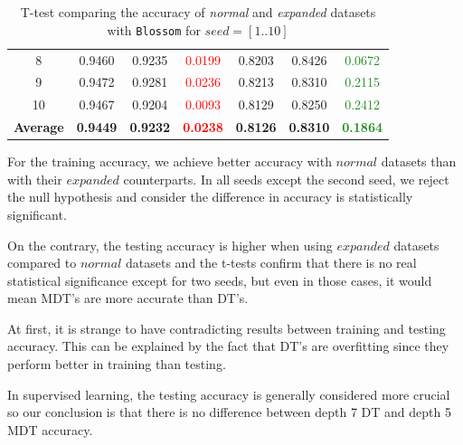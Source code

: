 \documentclass[12pt]{report}
\theoremstyle{definition}
\theoremstyle{definition}
\theoremstyle{definition}
\begin{document}
\begin{table}[ht]
{\begin{tabular}{ccccccc}
    \multicolumn{1}{c}{8}  & \multicolumn{1}{c}{0.9460} & \multicolumn{1}{c}{0.9235} & \multicolumn{1}{c}{\textcolor{        red}{0.0199}} & \multicolumn{1}{c}{0.8203} & \multicolumn{1}{c}{0.8426} & \multicolumn{1}{c}{\textcolor{ForestGreen}{0.0672}} \\
    \multicolumn{1}{c}{9}  & \multicolumn{1}{c}{0.9472} & \multicolumn{1}{c}{0.9281} & \multicolumn{1}{c}{\textcolor{        red}{0.0236}} & \multicolumn{1}{c}{0.8213} & \multicolumn{1}{c}{0.8310} & \multicolumn{1}{c}{\textcolor{ForestGreen}{0.2115}} \\
    \multicolumn{1}{c}{10} & \multicolumn{1}{c}{0.9467} & \multicolumn{1}{c}{0.9204} & \multicolumn{1}{c}{\textcolor{        red}{0.0093}} & \multicolumn{1}{c}{0.8129} & \multicolumn{1}{c}{0.8250} & \multicolumn{1}{c}{\textcolor{ForestGreen}{0.2412}} \\
    \hline
    \multicolumn{1}{c}{\bf Average} & \multicolumn{1}{c}{\bf 0.9449} & \multicolumn{1}{c}{\bf 0.9232} & \multicolumn{1}{c}{\textcolor{red}{\bf 0.0238}} & \multicolumn{1}{c}{\bf 0.8126} & \multicolumn{1}{c}{\bf 0.8310} & \multicolumn{1}{c}{\textcolor{ForestGreen}{\bf 0.1864}} \\
    \hline
    \end{tabular}}
    \caption{T-test comparing the accuracy of \textit{normal} and \textit{expanded} datasets with \texttt{Blossom} for $seed=[1..10]$}
    \label{fig:ttest}
\end{table}

For the training accuracy, we achieve better accuracy with $normal$ datasets than with their $expanded$ counterparts. In all seeds except the second seed, we reject the null hypothesis and consider the difference in accuracy is statistically significant.

On the contrary, the testing accuracy is higher when using $expanded$ datasets compared to $normal$ datasets and the t-tests confirm that there is no real statistical significance except for two seeds, but even in those cases, it would mean MDT's are more accurate than DT's.

At first, it is strange to have contradicting results between training and testing accuracy. This can be explained by the fact that DT's are overfitting since they perform better in training than testing.

In supervised learning, the testing accuracy is generally considered more crucial so our conclusion is that there is no difference between depth 7 DT and depth 5 MDT accuracy.
\end{document}
